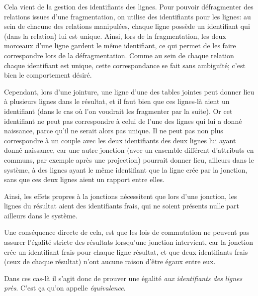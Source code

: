 Cela vient de la gestion des identifiants des lignes.
Pour pouvoir défragmenter des relations issues d'une
fragmentation, on utilise des identifiants pour les lignes:
au sein de chacune des relations manipulées, chaque ligne
possède un identifiant qui (dans la relation) 
lui est unique.
Ainsi, lors de la fragmentation, les deux morceaux
d'une ligne gardent le même identifiant,
ce qui permet de les faire correspondre lors de la 
défragmentation.
Comme au sein de chaque relation chaque identifiant
est unique, cette correspondance se fait sans ambiguïté;
c'est bien le comportement désiré.

Cependant, lors d'une jointure, une ligne d'une des tables
jointes peut donner lieu à plusieurs lignes dans
le résultat, et il faut bien que ces lignes-là aient
un identifiant
(dans le cas où l'on voudrait les fragmenter par
la suite). Or cet identifiant ne peut pas correspondre
à celui de l'une des lignes qui lui a donné naissance,
parce qu'il ne serait alors pas unique.
Il ne peut pas non plus correspondre à un couple
avec les deux identifiants des deux lignes lui ayant
donné naissance, car une autre jonction
(avec un ensemble différent d'attributs en communs,
par exemple après une projection) pourrait donner
lieu, ailleurs dans le système,
à des lignes ayant le même identifiant que la ligne
crée par la jonction, sans que ces deux lignes aient
un rapport entre elles.

Ainsi, les effets propres à la jonctions nécessitent
que lors d'une jonction, les lignes du résultat 
aient des identifiants frais, qui ne soient
présents nulle part ailleurs dans le système.

Une conséquence directe de cela, est que
les lois de commutation ne peuvent pas assurer l'égalité
stricte des résultats lorsqu'une jonction intervient,
car la jonction crée un identifiant frais pour chaque
ligne résultat, et que deux identifiants frais
(ceux de chaque résultat) n'ont aucune raison d'être
égaux entre eux.

Dans ces cas-là il s'agit donc de prouver une 
égalité \emph{aux identifiants des lignes près}.
C'est ça qu'on appelle \emph{équivalence}.